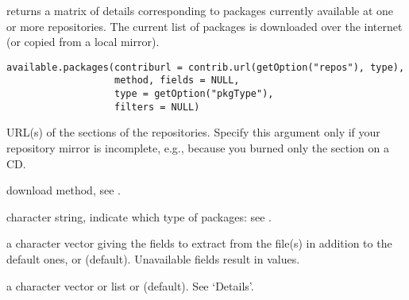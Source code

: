 %
\begin{SeeAlso}\relax
{}
\end{SeeAlso}
%
\begin{Description}\relax
{} returns a matrix of details corresponding to
packages currently available at one or more repositories. The
current list of packages is downloaded over the internet (or copied
from a local mirror).
\end{Description}
%
\begin{Usage}
\begin{verbatim}
available.packages(contriburl = contrib.url(getOption("repos"), type),
                   method, fields = NULL,
                   type = getOption("pkgType"),
                   filters = NULL)
\end{verbatim}
\end{Usage}
%
\begin{Arguments}
\begin{ldescription}
\item[\code{contriburl}] 
URL(s) of the  sections of the repositories.
Specify this argument only if your repository mirror is incomplete,
e.g., because you burned only the  section on a CD.

\item[\code{method}] 
download method, see .

\item[\code{type}] 
character string, indicate which type of packages: see
.

\item[\code{fields}] 
a character vector giving the fields to extract from
the  file(s) in addition to the default ones, or
 (default).  Unavailable fields result in 
values.

\item[\code{filters}] 
a character vector or list or  (default). See `Details'.

\end{ldescription}
\end{Arguments}
%
